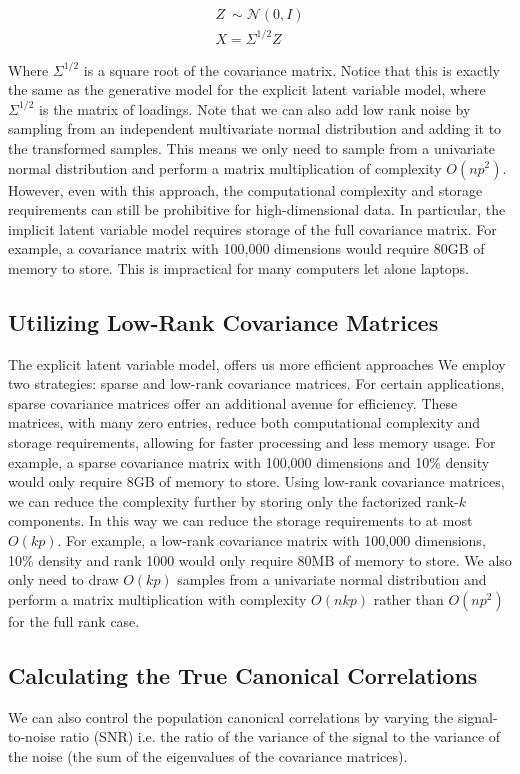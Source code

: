 \begin{align}
    Z~\sim \mathcal{N}(0, I) \\
    X = \Sigma^{1/2}Z
\end{align}

Where \( \Sigma^{1/2} \) is a square root of the covariance matrix.
Notice that this is exactly the same as the generative model for the explicit latent variable model, where \( \Sigma^{1/2} \) is the matrix of loadings.
Note that we can also add low rank noise by sampling from an independent multivariate normal distribution and adding it to the transformed samples.
This means we only need to sample from a univariate normal distribution and perform a matrix multiplication of complexity \(O(np^2)\).
However, even with this approach, the computational complexity and storage requirements can still be prohibitive for high-dimensional data.
In particular, the implicit latent variable model requires storage of the full covariance matrix.
For example, a covariance matrix with 100,000 dimensions would require 80GB of memory to store.
This is impractical for many computers let alone laptops.

\subsection{Utilizing Low-Rank Covariance Matrices}
The explicit latent variable model, offers us more efficient approaches
We employ two strategies: sparse and low-rank covariance matrices.
For certain applications, sparse covariance matrices offer an additional avenue for efficiency.
These matrices, with many zero entries, reduce both computational complexity and storage requirements, allowing for faster processing and less memory usage.
For example, a sparse covariance matrix with 100,000 dimensions and 10\% density would only require 8GB of memory to store.
Using low-rank covariance matrices, we can reduce the complexity further by storing only the factorized rank-$k$ components.
In this way we can reduce the storage requirements to at most \(O(kp)\).
For example, a low-rank covariance matrix with 100,000 dimensions, 10\% density and rank 1000 would only require 80MB of memory to store.
We also only need to draw \(O(kp)\) samples from a univariate normal distribution and perform a matrix multiplication with complexity \(O(nkp)\) rather than \(O(np^2)\) for the full rank case.

\subsection{Calculating the True Canonical Correlations}
We can also control the population canonical correlations by varying the signal-to-noise ratio (SNR) i.e. the ratio of the variance of the signal to the variance of the noise (the sum of the eigenvalues of the covariance matrices).

